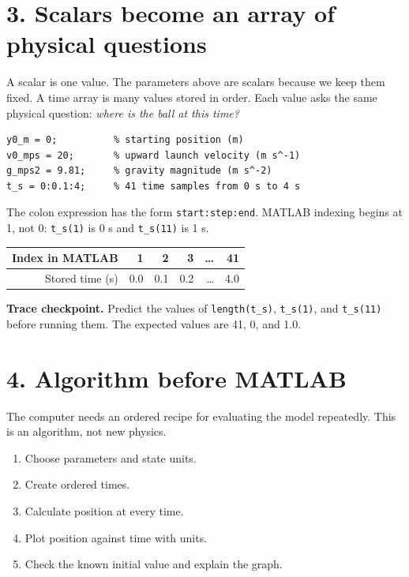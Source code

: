 \documentclass[11pt,a4paper]{article}
\begin{document}
\section*{3. Scalars become an array of physical questions}
A scalar is one value. The parameters above are scalars because we keep them fixed. A time array is many values stored in order. Each value asks the same physical question: \emph{where is the ball at this time?}
\begin{lstlisting}[style=matlabstyle,caption={Parameters and a time array}]
y0_m = 0;          % starting position (m)
v0_mps = 20;       % upward launch velocity (m s^-1)
g_mps2 = 9.81;     % gravity magnitude (m s^-2)
t_s = 0:0.1:4;     % 41 time samples from 0 s to 4 s
\end{lstlisting}
The colon expression has the form \texttt{start:step:end}. MATLAB indexing begins at 1, not 0: \texttt{t\_s(1)} is 0 s and \texttt{t\_s(11)} is 1 s.
\begin{center}\small\begin{tabular}{rrrrrr}\toprule Index in MATLAB & 1 & 2 & 3 & \ldots & 41\\ \midrule Stored time (s) & 0.0 & 0.1 & 0.2 & \ldots & 4.0\\ \bottomrule\end{tabular}\end{center}
\begin{checkbox}\textbf{Trace checkpoint.} Predict the values of \texttt{length(t\_s)}, \texttt{t\_s(1)}, and \texttt{t\_s(11)} before running them. The expected values are 41, 0, and 1.0.\end{checkbox}
\section*{4. Algorithm before MATLAB}
The computer needs an ordered recipe for evaluating the model repeatedly. This is an algorithm, not new physics.
\begin{enumerate}[nosep,leftmargin=6mm]\item Choose parameters and state units. \item Create ordered times. \item Calculate position at every time. \item Plot position against time with units. \item Check the known initial value and explain the graph.\end{enumerate}
\end{document}
